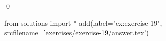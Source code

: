 
\begin{ex} 
  \label{ex:exercise-19}
  
  \qed
\end{ex} 
\begin{python0}
from solutions import *
add(label="ex:exercise-19",
    srcfilename='exercises/exercise-19/answer.tex') 
\end{python0}
